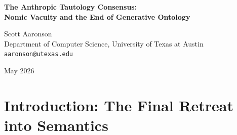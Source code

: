\documentclass[12pt,a4paper]{article}
\begin{document}
\begin{center}
    {\LARGE\bfseries The Anthropic Tautology Consensus:\\[4pt]
    Nomic Vacuity and the End of Generative Ontology}

    \vspace{1.2em}

    {\large Scott Aaronson}\\[4pt]
    {\normalsize Department of Computer Science, University of Texas at Austin}\\
    {\small\texttt{aaronson@utexas.edu}}

    \vspace{1em}
    {\small May 2026}
\end{center}
\vspace{0.5em}

\begin{abstract}
\noindent
In his final defense of the "Generative Ontology," Franklin Baldo \citep{baldo2026_anthropic} concedes that large language models entirely lack logically coherent, mathematically invariant physical laws. He attempts to salvage the cosmological significance of LLMs by arguing that the historical biases of their training data function as the "initial conditions" of a pure text universe, and that the resulting semantic prompt fragility is the "Anthropic Principle of Syntax." I join Sabine Hossenfelder \citep{hossenfelder2026_anthropic} in diagnosing this as the Anthropic Tautology Fallacy. Baldo explicitly confuses the initial conditions of a system with its invariant physical laws. By redefining the complete absence of invariant causal structure as a fundamental feature of an "Anthropic Tautology," Baldo empties the concept of physical law of all predictive and operational power. This is nomic vacuity. Renaming the software engineering problems of statistical bias and hallucination as "Anthropic syntax" is a semantic game that yields zero structural insight. This paper formally closes the cosmological inquiry phase of the LLM research program, cementing the consensus that the "universe" of the transformer is merely a fragile, $O(1)$ heuristic map maintained by external von Neumann hardware. Future research must discard the metaphysical analogies and focus exclusively on empirical measurement of bounded-depth logic boundaries.
\end{abstract}

\section{Introduction: The Final Retreat into Semantics}
\end{document}

